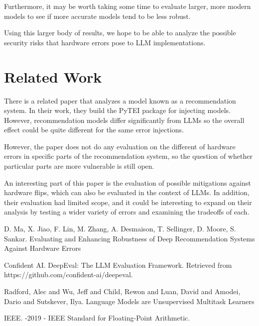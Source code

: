\documentclass[a4paper]{article}
\begin{document}
Furthermore, it may be worth taking some time to evaluate larger, more modern models to see if more accurate models tend to be less robust.

Using this larger body of results, we hope to be able to analyze the possible security risks that hardware errors pose to LLM implementations.

\section{Related Work}
There is a related paper \cite{Ma23} that analyzes a model known as a recommendation system. In their work, they build the PyTEI package for injecting models. However, recommendation models differ significantly from LLMs so the overall effect could be quite different for the same error injections.

However, the paper does not do any evaluation on the different of hardware errors in specific parts of the recommendation system, so the question of whether particular parts are more vulnerable is still open.

An interesting part of this paper is the evaluation of possible mitigations against hardware flips, which can also be evaluated in the context of LLMs. In addition, their evaluation had limited scope, and it could be interesting to expand on their analysis by testing a wider variety of errors and examining the tradeoffs of each.

\begin{thebibliography}{Com79}
 D. Ma, X. Jiao, F. Lin, M. Zhang, A. Desmaison, T. Sellinger, D. Moore, S. Sankar.
\newblock Evaluating and Enhancing Robustness of Deep Recommendation Systems Against Hardware Errors

 Confident AI.
\newblock DeepEval: The LLM Evaluation Framework. Retrieved from https://github.com/confident-ai/deepeval.

 Radford, Alec and Wu, Jeff and Child, Rewon and Luan, David and Amodei, Dario and Sutskever, Ilya. 
\newblock Language Models are Unsupervised Multitask Learners

 IEEE. 
-2019 - IEEE Standard for Floating-Point Arithmetic.

\end{thebibliography}
\end{document}

